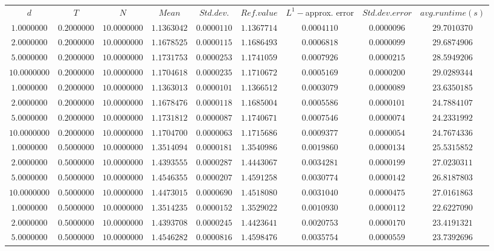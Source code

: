 \begin{tabular}{ccccccccc}
$d$ & $T$ & $N$ & $Mean$ & $Std. dev.$ & $Ref. value$ & $L^1-$approx. error & $Std. dev. error$ & $avg. runtime (s)$\\
$1.0000000$ & $0.2000000$ & $10.0000000$ & $1.1363042$ & $0.0000110$ & $1.1367714$ & $0.0004110$ & $0.0000096$ & $29.7010370$\\
$2.0000000$ & $0.2000000$ & $10.0000000$ & $1.1678525$ & $0.0000115$ & $1.1686493$ & $0.0006818$ & $0.0000099$ & $29.6874906$\\
$5.0000000$ & $0.2000000$ & $10.0000000$ & $1.1731753$ & $0.0000253$ & $1.1741059$ & $0.0007926$ & $0.0000215$ & $28.5949206$\\
$10.0000000$ & $0.2000000$ & $10.0000000$ & $1.1704618$ & $0.0000235$ & $1.1710672$ & $0.0005169$ & $0.0000200$ & $29.0289344$\\
$1.0000000$ & $0.2000000$ & $10.0000000$ & $1.1363013$ & $0.0000101$ & $1.1366512$ & $0.0003079$ & $0.0000089$ & $23.6350185$\\
$2.0000000$ & $0.2000000$ & $10.0000000$ & $1.1678476$ & $0.0000118$ & $1.1685004$ & $0.0005586$ & $0.0000101$ & $24.7884107$\\
$5.0000000$ & $0.2000000$ & $10.0000000$ & $1.1731812$ & $0.0000087$ & $1.1740671$ & $0.0007546$ & $0.0000074$ & $24.2331992$\\
$10.0000000$ & $0.2000000$ & $10.0000000$ & $1.1704700$ & $0.0000063$ & $1.1715686$ & $0.0009377$ & $0.0000054$ & $24.7674336$\\
$1.0000000$ & $0.5000000$ & $10.0000000$ & $1.3514094$ & $0.0000181$ & $1.3540986$ & $0.0019860$ & $0.0000134$ & $25.5315852$\\
$2.0000000$ & $0.5000000$ & $10.0000000$ & $1.4393555$ & $0.0000287$ & $1.4443067$ & $0.0034281$ & $0.0000199$ & $27.0230311$\\
$5.0000000$ & $0.5000000$ & $10.0000000$ & $1.4546355$ & $0.0000207$ & $1.4591258$ & $0.0030774$ & $0.0000142$ & $26.8187803$\\
$10.0000000$ & $0.5000000$ & $10.0000000$ & $1.4473015$ & $0.0000690$ & $1.4518080$ & $0.0031040$ & $0.0000475$ & $27.0161863$\\
$1.0000000$ & $0.5000000$ & $10.0000000$ & $1.3514235$ & $0.0000152$ & $1.3529022$ & $0.0010930$ & $0.0000112$ & $22.6227090$\\
$2.0000000$ & $0.5000000$ & $10.0000000$ & $1.4393708$ & $0.0000245$ & $1.4423641$ & $0.0020753$ & $0.0000170$ & $23.4191321$\\
$5.0000000$ & $0.5000000$ & $10.0000000$ & $1.4546282$ & $0.0000816$ & $1.4598476$ & $0.0035754$ & $0.0000559$ & $23.7392696$\\

\end{tabular}

